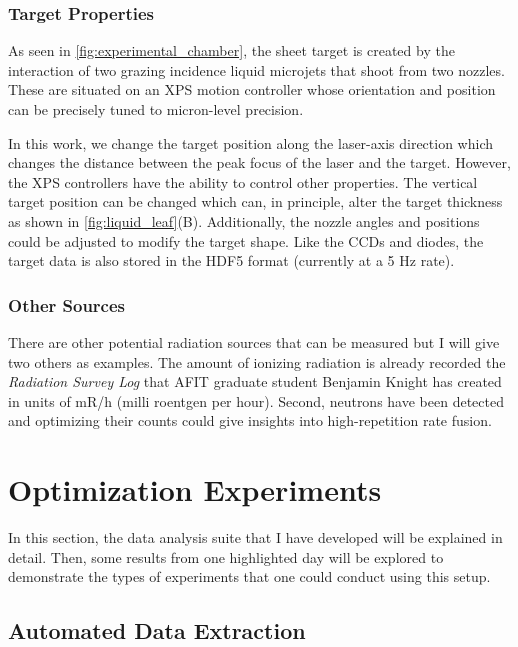 \subsubsection{Target Properties}

As seen in \autoref{fig:experimental_chamber}, the sheet target is created by the interaction of two grazing incidence liquid microjets that shoot from two nozzles. These  are situated on an XPS motion controller whose orientation and position can be precisely tuned to micron-level precision. 

In this work, we change the target position along the laser-axis direction which changes the distance between the peak focus of the laser and the target. However, the XPS controllers have the ability to control other properties. The vertical target position can be changed which can, in principle, alter the target thickness as shown in \autoref{fig:liquid_leaf}(B). Additionally, the nozzle angles and positions could be adjusted to modify the target shape. Like the \gls{CCD}s and diodes, the target data is also stored in the \gls{HDF5} format (currently at a 5 Hz rate).

\subsubsection{Other Sources}
There are other potential radiation sources that can be measured but I will give two others as examples. The amount of ionizing radiation is already recorded the \emph{Radiation Survey Log} that AFIT graduate student Benjamin Knight has created in units of mR/h (milli roentgen per hour). Second, neutrons have been detected \cite{Knight_2024_HPLSE} and optimizing their counts could give insights into high-repetition rate fusion.

\section{Optimization Experiments} \label{sec:daq_results}

In this section, the data analysis suite that I have developed will be explained in detail. Then, some results from one highlighted day will be explored to demonstrate the types of experiments that one could conduct using this setup.

\subsection{Automated Data Extraction}

